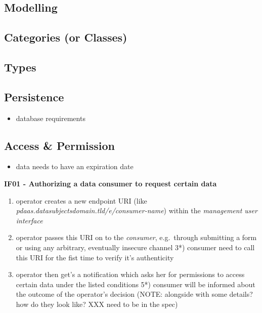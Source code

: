 \documentclass[12pt,english,a4paper,titlepage,cleardoublepage=empty,dottedtoc]{report}
\providecommand{\tightlist}{%
  \setlength{\itemsep}{0pt}\setlength{\parskip}{0pt}}
\begin{document}
\subsection{Modelling}\label{modelling}

\subsection{Categories (or Classes)}\label{categories-or-classes}

\subsection{Types}\label{types}

\subsection{Persistence}\label{persistence-1}

\begin{itemize}
\tightlist
\item
  database requirements
\end{itemize}

\subsection{Access \& Permission}\label{access-permission}

\begin{itemize}
\tightlist
\item
  data needs to have an expiration date
\end{itemize}

\textbf{IF01 - Authorizing a data consumer to request certain data}

\begin{enumerate}
\def\labelenumi{\arabic{enumi})}
\tightlist
\item
  operator creates a new endpoint URI (like
  \emph{pdaas.datasubjectsdomain.tld/e/consumer-name}) within the
  \emph{management user interface}
\item
  operator passes this URI on to the \emph{consumer}, e.g.~through
  submitting a form or using any arbitrary, eventually insecure channel
  3*) consumer need to call this URI for the fist time to verify it's
  authenticity
\item
  operator then get's a notification which asks her for permissions to
  access certain data under the listed conditions 5*) consumer will be
  informed about the outcome of the operator's decision (NOTE: alongside
  with some details? how do they look like? XXX need to be in the spec)
\end{enumerate}
\end{document}
